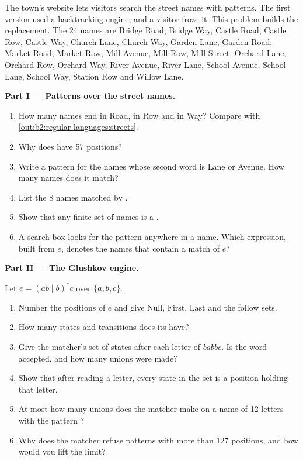 \begin{problem}\label{pb:b2:regular-languages:1}
The town's website lets visitors search the street names with patterns. The first version used a backtracking engine,
and a visitor froze it. This problem builds the replacement. The 24 names are Bridge Road, Bridge Way, Castle Road,
Castle Row, Castle Way, Church Lane, Church Way, Garden Lane, Garden Road, Market Road, Market Row, Mill Avenue, Mill
Row, Mill Street, Orchard Lane, Orchard Row, Orchard Way, River Avenue, River Lane, School Avenue, School Lane, School
Way, Station Row and Willow Lane.

\medskip\noindent\textbf{Part I --- Patterns over the street names.}\par\nopagebreak
\begin{enumerate}
\item How many names end in Road, in Row and in Way? Compare with \cref{out:b2:regular-languages:streets}.
\item Why does  have 57 positions?
\item Write a pattern for the names whose second word is Lane or Avenue. How many names does it match?
\item List the 8 names matched by .
\item Show that any finite set of names is a .
\item A search box looks for the pattern anywhere in a name. Which expression, built from $e$, denotes the names that
contain a match of $e$?
\end{enumerate}

\medskip\noindent\textbf{Part II --- The Glushkov engine.}\par\nopagebreak
Let $e = (ab \mid b)^*c$ over $\{a, b, c\}$.
\begin{enumerate}[resume, beginpenalty=10000]
\item Number the positions of $e$ and give $\mathrm{Null}$, $\mathrm{First}$, $\mathrm{Last}$ and the follow sets.
\item How many states and transitions does its  have?
\item Give the matcher's set of states after each letter of $babbc$. Is the word accepted, and how many unions were
made?
\item Show that after reading a letter, every state in the set is a position holding that letter.
\item At most how many unions does the matcher make on a name of 12 letters with the pattern ?
\item Why does the matcher refuse patterns with more than 127 positions, and how would you lift the limit?
\end{enumerate}


\end{problem}
